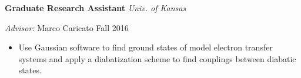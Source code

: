 \vspace{\y}

\begin{minipage}{\textwidth}
  {\bf Graduate Research Assistant} \hfill \textit{Univ. of Kansas}

  \textit{Advisor: } Marco Caricato \hfill Fall 2016

  \begin{itemize}[rightmargin=\dimexpr\linewidth-10cm-\leftmargin\relax,noitemsep,topsep=0cm]
    \raggedright
    \item Use Gaussian software to find ground states of model electron transfer systems and apply a diabatization scheme to find couplings between diabatic states.
  \end{itemize}
\end{minipage}